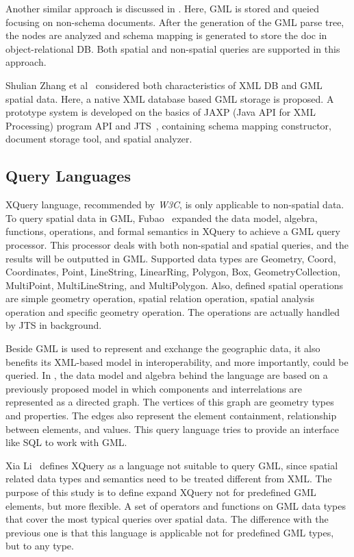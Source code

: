 \documentclass[a4paper,12pt]{article}
\begin{document}
Another similar approach is discussed in \cite{Zhu2011}. Here, GML is stored and queied 
focusing on non-schema documents. After the generation of the GML parse tree,
the nodes are analyzed and schema mapping is generated to store the doc in object-relational DB. 
Both spatial and non-spatial queries are supported in this approach.

Shulian Zhang et al~\cite{Zhang2008} considered both characteristics of XML DB 
and GML spatial data. Here, a native XML database based GML storage is proposed. 
A prototype system is developed on the basics of JAXP (Java API for XML Processing) program API 
and JTS~\cite{jts}, containing schema mapping constructor, document storage tool, 
and spatial analyzer.

\subsection{Query Languages}
\label{query}
XQuery language, recommended by \emph{W3C}, is only 
applicable to non-spatial data. To query spatial data in GML,
Fubao~\cite{Fubao2010} expanded the data model, algebra, functions, operations, 
and formal semantics in XQuery to achieve a GML query processor.
This processor deals with both non-spatial and spatial queries, 
and the results will be outputted in GML.
Supported data types are  Geometry, Coord, Coordinates, Point, LineString, LinearRing, 
Polygon, Box, GeometryCollection, MultiPoint, MultiLineString, and MultiPolygon.
Also, defined spatial operations are simple geometry operation, spatial relation 
operation, spatial analysis operation and specific geometry operation.
The operations are actually handled by JTS in background.

Beside GML is used to represent and exchange 
the geographic data, it also benefits its XML-based model in interoperability, 
and more importantly, could be queried. In \cite{corcoles2001}, the data model 
and algebra behind the language are based on a previously proposed model 
in which components and interrelations are represented as a directed graph. 
The vertices of this graph are geometry types and properties. The edges also
represent the element containment, relationship between elements, and values. 
This query language tries to provide an interface like SQL to work with GML.

Xia Li~\cite{Lisa2006} defines XQuery as a language  not suitable to query GML, 
since spatial related data types and semantics need to be treated different from XML. 
The purpose of this study is to define expand XQuery not for predefined GML elements, 
but more flexible.  A set of operators and functions on GML data types that cover 
the most typical queries over spatial data. The difference with the previous one is 
that this language is applicable not for predefined GML types, but to any type.
\end{document}
